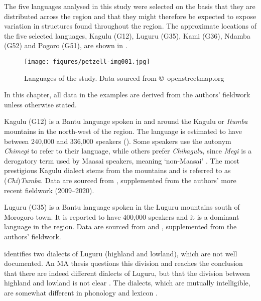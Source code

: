 \documentclass[output=paper,
            colorlinks, citecolor=brown
            ,draftmode
		  ]{langscibook}
\begin{document}
The five languages analysed in this study were selected on the basis that they are distributed across the region and that they might therefore be expected to expose variation in structures found throughout the region. The approximate locations of the five selected languages, Kagulu (G12), Luguru (G35), Kami (G36), Ndamba (G52) and Pogoro (G51), are shown in .



\begin{figure}
\texttt{[image: figures/petzell-img001.jpg]}
\caption{Languages of the study.  Data sourced from ©~openstreetmap.org}
\label{fig:petzell:1}
\end{figure}

In this chapter, all data in the examples are derived from the authors' fieldwork unless otherwise stated.



Kagulu (G12) is a Bantu language spoken in and around the Kagulu or \textit{Itumba} mountains in the north-west of the region. The language is estimated to have between 240,000 \citep{Petzell2008} and 336,000 speakers (\citealt{LanguagesofTanzaniaProject2009}). Some speakers use the autonym \textit{Chimegi} to refer to their language, while others prefer \textit{Chikagulu,} since \textit{Megi} is a derogatory term used by Maasai speakers, meaning `non-Maasai' \citep[251]{Mol1996}. The most prestigious Kagulu dialect stems from the mountains and is referred to as (\textit{Chi})\textit{Tumba}. Data are sourced from \citet{Petzell2008}, supplemented from the authors' more recent fieldwork (2009--2020).



Luguru (G35) is a Bantu language spoken in the Luguru mountains south of Morogoro town. It is reported to have 400,000 speakers \citep{LanguagesofTanzaniaProject2009} and it is a dominant language in the region. Data are sourced from \citet{Mkude1974} and \citet{Petzell2020}, supplemented from the authors' fieldwork.



\citet{Mkude1974} identifies two dialects of Luguru (highland and lowland), which are not well documented. An MA thesis \citep{Moses2018} questions this division and reaches the conclusion that there are indeed different dialects of Luguru, but that the division between highland and lowland is not clear \citep[66]{Moses2018}. The dialects, which are mutually intelligible, are somewhat different in phonology and lexicon \citep{Moses2018}. 
\end{document}
